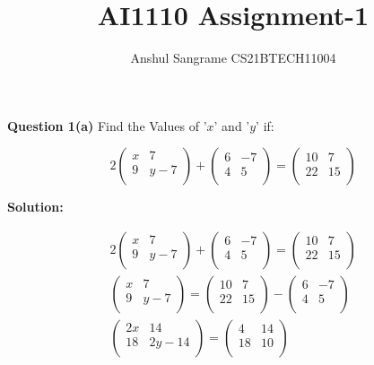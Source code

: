 \documentclass[12pt,twocolumn]{article}
\title{AI1110 Assignment-1}
\author{Anshul Sangrame CS21BTECH11004}
\begin{document}
\maketitle

\noindent \textbf{Question 1(a)} Find the Values of '$x $' and '$y $' if: 

$$
2
\begin{pmatrix}
x & 7 \\
9 & y-7 \\
\end{pmatrix}
+
\begin{pmatrix}
6 & -7 \\
4 & 5 \\
\end{pmatrix}
=
\begin{pmatrix}
10 & 7 \\
22 & 15 \\
\end{pmatrix}
$$

\noindent \textbf{Solution: }


\begin{align*}
2
\begin{pmatrix}
x & 7 \\
9 & y-7 \\
\end{pmatrix}
+
\begin{pmatrix}
6 & -7 \\
4 & 5 \\
\end{pmatrix}
=
\begin{pmatrix}
10 & 7 \\
22 & 15 \\
\end{pmatrix}
\\
\begin{pmatrix}
x & 7 \\
9 & y-7 \\
\end{pmatrix}
=
\begin{pmatrix}
10 & 7 \\
22 & 15 \\
\end{pmatrix}
-
\begin{pmatrix}
6 & -7 \\
4 & 5 \\
\end{pmatrix}
\\
\begin{pmatrix}
2x & 14 \\
18 & 2y-14 \\
\end{pmatrix}
=
\begin{pmatrix}
4 & 14\\
18 & 10\\
\end{pmatrix}
\end{align*}
\end{document}
